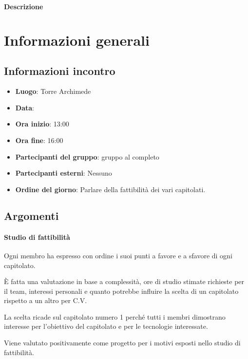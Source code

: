 \documentclass[a4paper, oneside, openany]{article}
\begin{document}
\begin{titlepage}
\begin{center}
        \vspace{1cm}

		\begin{center}
			\textbf{Descrizione\\}
			\DescrizioneDoc
		\end{center}
		
	\end{center}
\end{titlepage}

\restoregeometry
	
	\section{Informazioni generali}
		\subsection{Informazioni incontro}
			\begin{itemize}
				\item { \textbf{Luogo}:  Torre Archimede}
				\item { \textbf{Data}: \Data}
				\item { \textbf{Ora inizio}: 13:00}
				\item { \textbf{Ora fine}: 16:00}
				\item { \textbf{Partecipanti del gruppo}: gruppo al completo}
				\item { \textbf{Partecipanti esterni}: Nessuno}
				\item { \textbf{Ordine del giorno}: Parlare della fattibilità dei vari capitolati.}
			\end{itemize}

        \subsection{Argomenti}
            \paragraph{Studio di fattibilità}
            Ogni membro ha espresso con ordine i suoi punti a favore e a sfavore di ogni capitolato.\par
            È fatta una valutazione in base a complessità, ore di studio stimate richieste per il team, interessi personali e
            quanto potrebbe influire la scelta di un capitolato rispetto a un altro per C.V.\par
            La scelta ricade sul capitolato numero 1 perché tutti i membri dimostrano interesse per l'obiettivo del capitolato
            e per le tecnologie interessate.\par
            Viene valutato positivamente come progetto per i motivi esposti nello studio di fattibilità.
\end{document}
